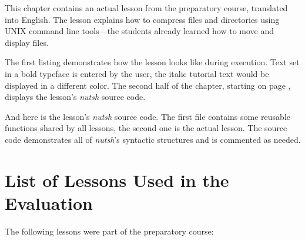 \documentclass[paper=a4,twoside,abstract=on,cleardoublepage=empty,numbers=noenddot,toc=bib,12pt,appendixprefix=true]{scrreprt}
\begin{document}
This chapter contains an actual lesson from the preparatory course, translated into English. The lesson explains how to compress files and directories using UNIX command line tools---the students already learned how to move and display files.

The first listing demonstrates how the lesson looks like during execution. Text set in a bold typeface is entered by the user, the italic tutorial text would be displayed in a different color. The second half of the chapter, starting on page , displays the lesson's \emph{nutsh} source code.


%
And here is the lesson's \emph{nutsh} source code. The first file contains some reusable functions shared by all lessons, the second one is the actual lesson. The source code demonstrates all of \emph{nutsh}'s syntactic structures and is commented as needed.

\label{lst:compress}




\chapter{List of Lessons Used in the Evaluation}
\label{sec:lessons}

The following lessons were part of the preparatory course:
\end{document}
